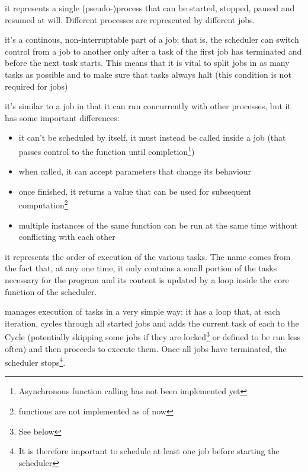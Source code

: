   \begin{description}[align=right]
    \item [Job] it represents a single (pseudo-)process that can be
      started, stopped, paused and resumed at will. Different
      processes are represented by different jobs.
    \item [Task] it's a continous, non-interruptable part of a job;
      that is, the scheduler can switch control from a job to
      another only after a task of the first job has terminated and
      before the next task starts. This means that it is vital to
      split jobs in as many tasks as possible and to make sure that
      tasks always halt (this condition is not required for jobs)
    \item [Function] it's similar to a job in that it can run
      concurrently with other processes, but it has some important
      differences:
      \begin{itemize}
        \item it can't be scheduled by itself, it must instead be
          called inside a job (that passes control to the function
          until completion\footnote{Asynchronous function calling
          has not been implemented yet})
        \item when called, it can accept parameters that change its
          behaviour
        \item once finished, it returns a value that can be used for
          subsequent computation\footnote{ functions are
          not implemented as of now}
        \item multiple instances of the same function can be run at
          the same time without conflicting with each other
      \end{itemize}
    \item [Cycle] it represents the order of execution of the
      various tasks. The name comes from the fact that, at any one
      time, it only contains a small portion of the tasks necessary
      for the program and its content is updated by a loop inside
      the core function of the scheduler.
  \end{description}
  
  \ScheMo{} manages execution of tasks in a very simple way: it has a
  loop that, at each iteration, cycles through all started jobs and
  adds the current task of each to the Cycle (potentially skipping
  some jobs if they are locked\footnote{See below} or defined to be
  run less often) and then proceeds to execute them. Once all jobs
  have terminated, the scheduler stops\footnote{It is therefore
  important to schedule at least one job before starting the
  scheduler}.

